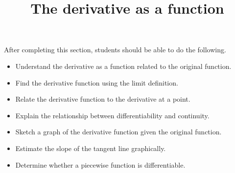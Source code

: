 \documentclass{ximera}
\title{The derivative as a function}
\begin{document}
\begin{abstract}
\end{abstract}

\maketitle

\begin{sectionOutcomes}

After completing this section, students should be able to do the following.

\begin{itemize}
	\item Understand the derivative as a function related to the original function.
	\item Find the derivative function using the limit definition.
	\item Relate the derivative function to the derivative at a point.
	\item Explain the relationship between differentiability and continuity.
	\item Sketch a graph of the derivative function given the original function.
	\item Estimate the slope of the tangent line graphically.
	\item Determine whether a piecewise function is differentiable.
\end{itemize}

\end{sectionOutcomes}
\end{document}
